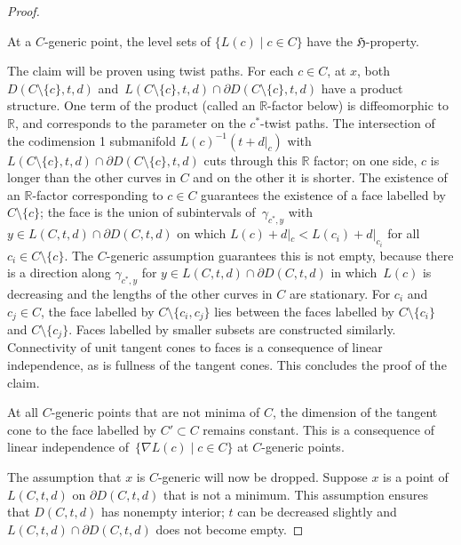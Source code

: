 \begin{proof}
\begin{Claim} At a $C$-generic point, the level sets of $\{L(c) \mid c\in C\}$ have the $\mathfrak{H}$-property.
\end{Claim}

The claim will be proven using twist paths. For each $c\in C$, at $x$, both $D(C\setminus \{c\},t,d)$ and~${L(C\setminus \{c\},t,d)\cap \partial D(C\setminus \{c\},t,d)}$ have a product structure. One term of the product (called an $\mathbb{R}$-factor below) is diffeomorphic to $\mathbb{R}$, and corresponds to the parameter on the $c^{*}$-twist paths. The intersection of the codimension 1 submanifold $L(c)^{-1}(t+d|_{c})$ with $L(C\setminus \{c\},t,d)\cap \partial D(C\setminus \{c\},t,d)$ cuts through this $\mathbb{R}$ factor; on one side, $c$ is longer than the other curves in $C$ and on the other it is shorter. The existence of an $\mathbb{R}$-factor corresponding to $c\in C$ guarantees the existence of a face labelled by $C\setminus \{c\}$; the face is the union of subintervals of~$\gamma_{c^{*},y}$ with~${y\in L(C,t,d)\cap \partial D(C,t,d)}$ on which $L(c)+d|_{c}<L(c_{i})+d|_{c_{i}}$ for all $c_{i}\in C\setminus \{c\}$. The $C$-generic assumption guarantees this is not empty, because there is a direction along $\gamma_{c^{*},y}$ for $y\in L(C,t,d)\cap \partial D(C,t,d)$ in which~$L(c)$ is decreasing and the lengths of the other curves in $C$ are stationary. For $c_{i}$ and $c_{j}\in C$, the face labelled by $C\setminus \{c_{i}, c_{j}\}$ lies between the faces labelled by $C\setminus \{c_{i}\}$ and $C\setminus \{c_{j}\}$. Faces labelled by smaller subsets are constructed similarly. Connectivity of unit tangent cones to faces is a consequence of linear independence, as is fullness of the tangent cones. This concludes the proof of the claim.

At all $C$-generic points that are not minima of $C$, the dimension of the tangent cone to the face labelled by $C'\subset C$ remains constant. This is a consequence of linear independence of~${\{\nabla L(c) \mid c\in C\}}$ at $C$-generic points.

The assumption that $x$ is $C$-generic will now be dropped. Suppose $x$ is a point of $L(C,t,d)$ on $\partial D(C,t,d)$ that is not a minimum. This assumption ensures that $D(C,t,d)$ has nonempty interior; $t$ can be decreased slightly and $L(C,t,d)\cap\partial D(C,t,d)$ does not become empty.


\end{proof}
